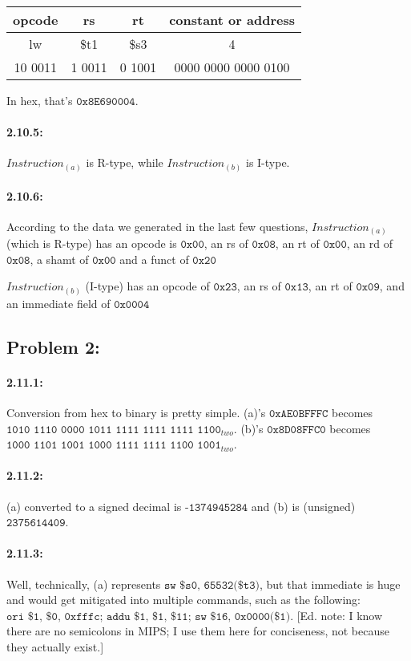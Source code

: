 \documentclass[a4paper]{article}
\begin{document}
\begin{center}
\begin{tabular}{|c|c|c|c|}
\hline
opcode & rs & rt & constant or address \\
\hline
\hline
lw & \$t1 & \$s3 & 4 \\ 
\hline
10 0011 & 1 0011 & 0 1001 & 0000 0000 0000 0100 \\
\hline
\end{tabular}
\end{center}

In hex, that's $\texttt{0x8E690004}$.

\paragraph*{2.10.5:} $Instruction_{(a)}$ is R-type, while $Instruction_{(b)}$ is I-type.

\paragraph*{2.10.6:} According to the data we generated in the last few questions, $Instruction_{(a)}$ (which is R-type) has an opcode is $\texttt{0x00}$, an rs of $\texttt{0x08}$, an rt of $\texttt{0x00}$, an rd of $\texttt{0x08}$, a shamt of $\texttt{0x00}$ and a funct of $\texttt{0x20}$

$Instruction_{(b)}$ (I-type) has an opcode of $\texttt{0x23}$, an rs of $\texttt{0x13}$, an rt of $\texttt{0x09}$, and an immediate field of $\texttt{0x0004}$

\subsection*{Problem 2:}
\paragraph*{2.11.1:} Conversion from hex to binary is pretty simple. (a)'s $\texttt{0xAE0BFFFC}$ becomes $\texttt{1010 1110 0000 1011 1111 1111 1111 1100}_{two}$. (b)'s $\texttt{0x8D08FFC0}$ becomes $\texttt{1000 1101 1001 1000 1111 1111 1100 1001}_{two}$.

\paragraph*{2.11.2:}  (a) converted to a signed decimal is $\texttt{-1374945284}$ and (b) is (unsigned) $\texttt{2375614409}$.

\paragraph*{2.11.3:} Well, technically, (a) represents $\texttt{sw \$s0, 65532(\$t3)}$, but that immediate is huge and would get mitigated into multiple commands, such as the following: $\texttt{ori \$1, \$0, 0xfffc; addu \$1, \$1, \$11; sw \$16, 0x0000(\$1)}$. [Ed. note: I know there are no semicolons in MIPS; I use them here for conciseness, not because they actually exist.]
\end{document}
